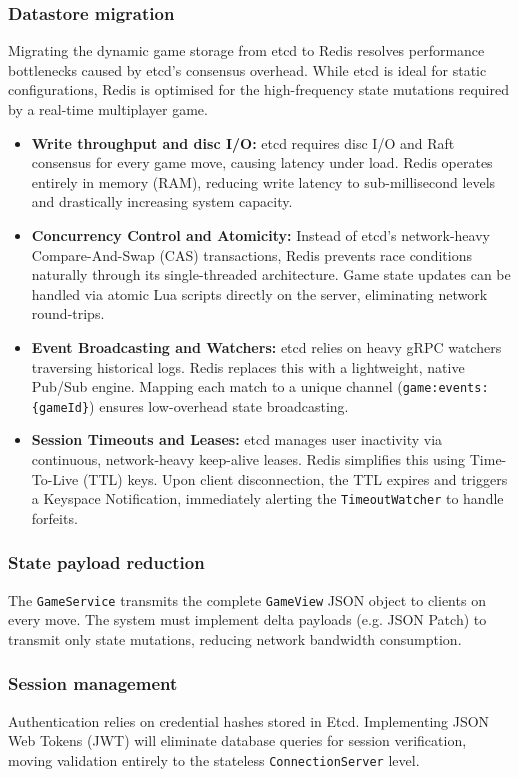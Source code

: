 \documentclass{scrartcl}
\begin{document}
\subsubsection*{Datastore migration}
Migrating the dynamic game storage from etcd to Redis resolves performance bottlenecks caused by etcd's consensus overhead. While etcd is ideal for static configurations, Redis is optimised for the high-frequency state mutations required by a real-time multiplayer game.
\begin{itemize}
    \item \textbf{Write throughput and disc I/O:} etcd requires disc I/O and Raft consensus for every game move, causing latency under load. Redis operates entirely in memory (RAM), reducing write latency to sub-millisecond levels and drastically increasing system capacity.
    
    \item \textbf{Concurrency Control and Atomicity:} Instead of etcd's network-heavy Compare-And-Swap (CAS) transactions, Redis prevents race conditions naturally through its single-threaded architecture. Game state updates can be handled via atomic Lua scripts directly on the server, eliminating network round-trips.
    
    \item \textbf{Event Broadcasting and Watchers:} etcd relies on heavy gRPC watchers traversing historical logs. Redis replaces this with a lightweight, native Pub/Sub engine. Mapping each match to a unique channel (\texttt{game:events:\{gameId\}}) ensures low-overhead state broadcasting.
    
    \item \textbf{Session Timeouts and Leases:} etcd manages user inactivity via continuous, network-heavy keep-alive leases. Redis simplifies this using Time-To-Live (TTL) keys. Upon client disconnection, the TTL expires and triggers a Keyspace Notification, immediately alerting the \texttt{TimeoutWatcher} to handle forfeits.
\end{itemize}
\subsubsection*{State payload reduction} The \texttt{GameService} transmits the complete \texttt{GameView} JSON object to clients on every move. The system must implement delta payloads (e.g. JSON Patch) to transmit only state mutations, reducing network bandwidth consumption.
\subsubsection*{Session management} Authentication relies on credential hashes stored in Etcd. Implementing JSON Web Tokens (JWT) will eliminate database queries for session verification, moving validation entirely to the stateless \texttt{ConnectionServer} level.
\end{document}
